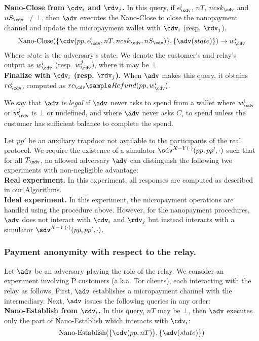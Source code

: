 \textbf{Nano-Close from $\cdv_i$ and $\rdv_j$.}
In this query, if $\epsilon^i_\cdv$, $nT$, $ncsk_\cdv$ and $nS_\cdv$ $\neq \bot$, then $\adv$ executes the Nano-Close to close the nanopayment channel and update the micropayment wallet with $\cdv_i$ (resp.
$\rdv_j$).
$$\operatorname{Nano-Close}(\{\cdv(pp, \epsilon^i_\cdv, nT, ncsk_\cdv, nS_\cdv)\}, \{\adv(state)\}) \rightarrow w^i_\cdv$$ Where $state$ is the adversary's state.
We denote the customer's and relay's output as $w^i_\cdv$ (resp.
$w^j_\rdv$), where it may be $\bot$.\\

\textbf{Finalize with $\cdv_i$ (resp.
  $\rdv_j$).}
When $\adv$ makes this query, it obtains $rc^i_\cdv$, computed as $rc_\cdv \sample Refund(pp, w^i_\cdv)$.

We say that $\adv$ is $legal$ if $\adv$ never asks to spend from a wallet where $w^i_\cdv$ or $w^j_\rdv$ is $\bot$ or undefined, and where $\adv$ never asks $C_i$ to spend unless the customer has sufficient balance to complete the spend.

Let $pp'$ be an auxiliary trapdoor not available to the participants of the real protocol.
We require the existence of a simulator $\sdv^{X-Y(\cdot)}(pp, pp', \cdot)$ such that for all $T_\mdv$, no allowed adversary $\adv$ can distinguish the following two experiments with non-negligible advantage:\\ \textbf{Real experiment.}
In this experiment, all responses are computed as described in our Algorithms.\\ \textbf{Ideal experiment.}
In this experiment, the micropayment operations are handled using the procedure above.
However, for the nanopayment procedures, $\adv$ does not interact with $\cdv_i$ and $\rdv_j$ but instead interacts with a simulator $\sdv^{X-Y(\cdot)}(pp,pp',\cdot)$.

\subsubsection{Payment anonymity with respect to the relay.}
\label{def:anon2}

Let $\adv$ be an adversary playing the role of the relay.
We consider an experiment involving P customers (a.k.a.
Tor clients), each interacting with the relay as follows.
First, $\adv$ establishes a micropayment channel with the intermediary.
Next, $\adv$ issues the following queries in any order:\\

\textbf{Nano-Establish from $\cdv_i$.}
In this query, $nT$ may be $\bot$, then $\adv$ executes only the part of Nano-Establish which interacts with $\cdv_i$: $$\operatorname{Nano-Establish}(\{\cdv(pp, nT)\}, \{\adv(state)\})$$


